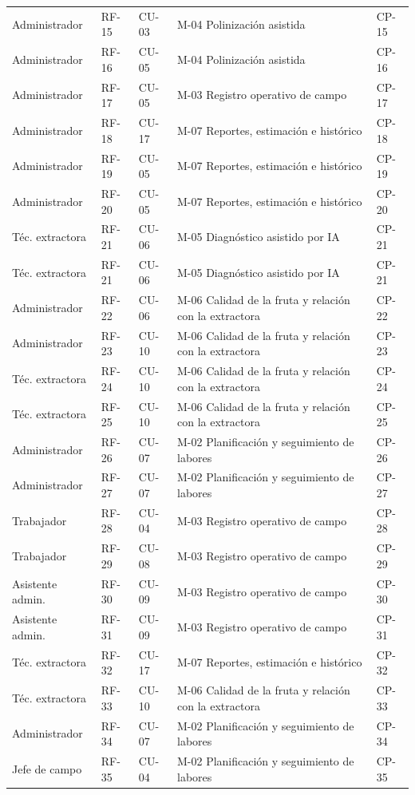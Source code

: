 \documentclass[11pt,letterpaper]{article}
\begin{document}
\begin{longtable}{p{2.6cm} p{1.4cm} p{1.4cm} p{5.4cm} p{1.8cm}}
Administrador & RF-15 & CU-03 & M-04 Polinización asistida & CP-15\\
Administrador & RF-16 & CU-05 & M-04 Polinización asistida & CP-16\\
Administrador & RF-17 & CU-05 & M-03 Registro operativo de campo & CP-17\\
Administrador & RF-18 & CU-17 & M-07 Reportes, estimación e histórico & CP-18\\
Administrador & RF-19 & CU-05 & M-07 Reportes, estimación e histórico & CP-19\\
Administrador & RF-20 & CU-05 & M-07 Reportes, estimación e histórico & CP-20\\
Téc. extractora & RF-21 & CU-06 & M-05 Diagnóstico asistido por IA & CP-21\\
Téc. extractora & RF-21 & CU-06 & M-05 Diagnóstico asistido por IA & CP-21\\
Administrador & RF-22 & CU-06 & M-06 Calidad de la fruta y relación con la extractora & CP-22\\
Administrador & RF-23 & CU-10 & M-06 Calidad de la fruta y relación con la extractora & CP-23\\
Téc. extractora & RF-24 & CU-10 & M-06 Calidad de la fruta y relación con la extractora & CP-24\\
Téc. extractora & RF-25 & CU-10 & M-06 Calidad de la fruta y relación con la extractora & CP-25\\
Administrador & RF-26 & CU-07 & M-02 Planificación y seguimiento de labores & CP-26\\
Administrador & RF-27 & CU-07 & M-02 Planificación y seguimiento de labores & CP-27\\
Trabajador & RF-28 & CU-04 & M-03 Registro operativo de campo & CP-28\\
Trabajador & RF-29 & CU-08 & M-03 Registro operativo de campo & CP-29\\
Asistente admin. & RF-30 & CU-09 & M-03 Registro operativo de campo & CP-30\\
Asistente admin. & RF-31 & CU-09 & M-03 Registro operativo de campo & CP-31\\
Téc. extractora & RF-32 & CU-17 & M-07 Reportes, estimación e histórico & CP-32\\
Téc. extractora & RF-33 & CU-10 & M-06 Calidad de la fruta y relación con la extractora & CP-33\\
Administrador & RF-34 & CU-07 & M-02 Planificación y seguimiento de labores & CP-34\\
Jefe de campo & RF-35 & CU-04 & M-02 Planificación y seguimiento de labores & CP-35\\

\end{longtable}
\end{document}

